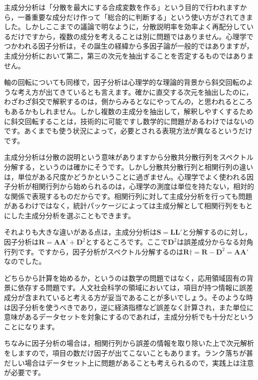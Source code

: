 \documentclass{ltjsbook}
\begin{document}
主成分分析は「分散を最大にする合成変数を作る」という目的で行われますから，一番重要な成分だけ作って「総合的に判断する」という使い方がされてきました。しかしここまでの議論で明なように，分散説明率を効率よく再配分しているだけですから，複数の成分を考えることは別に問題ではありません。心理学でつかわれる因子分析は，その誕生の経緯から多因子論が一般的ではありますが，主成分分析において第二，第三の次元を抽出することを否定するものではありません。

軸の回転についても同様で，因子分析は心理学的な理論的背景から斜交回転のような考え方が出てきているとも言えます。確かに直交する次元を抽出したのに，わざわざ斜交で解釈するのは，側からみるとなにやってんの，と思われるところもあるかもしれません。しかし複数の主成分を抽出して，解釈しやすくするために斜交回転することは，技術的に可能ですし数学的に問題があるわけではないのです。あくまでも使う状況によって，必要とされる表現方法が異なるというだけです。

主成分分析は分散の説明という意味がありますから分散共分散行列をスペクトル分解する，というのは確かにそうです。しかし分散共分散行列と相関行列の違いは，単位がある尺度かどうかということに過ぎません。心理学でよく使われる因子分析が相関行列から始められるのは，心理学の測度は単位を持たない，相対的な関係で表現するものだからです。相関行列に対して主成分分析を行っても問題があるわけではなく，統計パッケージによっては主成分解として相関行列をもとにした主成分分析を選ぶこともできます。

それよりも大きな違いがある点は，主成分分析は$\bm{S} = \bm{LL}'$と分解するのに対し，因子分析は$\bm{R} = \bm{AA}’ + \bm{D}^2$とするところです。ここで$\bm{D}^2$は誤差成分からなる対角行列です。ですから，因子分析がスペクトル分解するのは$\bm{R}\dagger = \bm{R}-\bm{D}^2 = \bm{AA}'$なのでした。

どちらから計算を始めるか，というのは数学の問題ではなく，応用領域固有の背景に依存する問題です。人文社会科学の領域においては，項目が持つ情報に誤差成分が含まれていると考える方が妥当であることが多いでしょう。そのような時は因子分析を使うべきであり，逆に経済指標など誤差なく計算され，また単位に意味があるデータセットを対象にするのであれば，主成分分析でも十分だということになります。

ちなみに因子分析の場合は，相関行列から誤差の情報を取り除いた上で次元解析をしますので，項目の数だけ因子が出てこないこともあります。ランク落ちが甚だしい場合はデータセット上に問題があることも考えられるので，実践上は注意が必要です。
\end{document}
